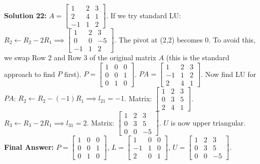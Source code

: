 \documentclass[11pt]{article}
\begin{document}
\vspace{0.5cm}
\textbf{Solution 22:}
$A = \begin{bmatrix} 1 & 2 & 3 \\ 2 & 4 & 1 \\ -1 & 1 & 2 \end{bmatrix}$.
If we try standard LU: $R_2 \leftarrow R_2 - 2R_1 \implies \begin{bmatrix} 1 & 2 & 3 \\ 0 & 0 & -5 \\ -1 & 1 & 2 \end{bmatrix}$. The pivot at (2,2) becomes 0.
To avoid this, we swap Row 2 and Row 3 of the original matrix $A$ (this is the standard approach to find $P$ first).
$P = \begin{bmatrix} 1 & 0 & 0 \\ 0 & 0 & 1 \\ 0 & 1 & 0 \end{bmatrix}$.
$PA = \begin{bmatrix} 1 & 2 & 3 \\ -1 & 1 & 2 \\ 2 & 4 & 1 \end{bmatrix}$.
Now find LU for $PA$:
$R_2 \leftarrow R_2 - (-1)R_1 \implies l_{21} = -1$. Matrix: $\begin{bmatrix} 1 & 2 & 3 \\ 0 & 3 & 5 \\ 2 & 4 & 1 \end{bmatrix}$.
$R_3 \leftarrow R_3 - 2R_1 \implies l_{31} = 2$. Matrix: $\begin{bmatrix} 1 & 2 & 3 \\ 0 & 3 & 5 \\ 0 & 0 & -5 \end{bmatrix}$.
$U$ is now upper triangular.
\textbf{Final Answer:} $P = \begin{bmatrix} 1 & 0 & 0 \\ 0 & 0 & 1 \\ 0 & 1 & 0 \end{bmatrix}$, $L = \begin{bmatrix} 1 & 0 & 0 \\ -1 & 1 & 0 \\ 2 & 0 & 1 \end{bmatrix}$, $U = \begin{bmatrix} 1 & 2 & 3 \\ 0 & 3 & 5 \\ 0 & 0 & -5 \end{bmatrix}$.
\end{document}
